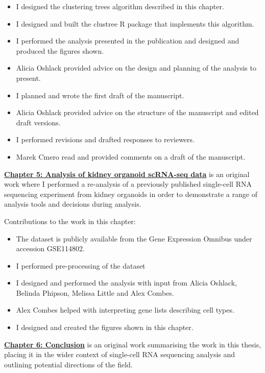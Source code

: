 \documentclass[11pt,a4paper,titlepage,twoside,openright]{style/unimelbthesis}
\theoremstyle{definition}
\theoremstyle{definition}
\theoremstyle{definition}
\theoremstyle{remark}
\begin{document}
\begin{frontmatter}
\begin{preface}
    \begin{itemize}
    \item
      I designed the clustering trees algorithm described in this chapter.
    \item
      I designed and built the clustree R package that implements this algorithm.
    \item
      I performed the analysis presented in the publication and designed and produced the figures shown.
    \item
      Alicia Oshlack provided advice on the design and planning of the analysis to present.
    \item
      I planned and wrote the first draft of the manuscript.
    \item
      Alicia Oshlack provided advice on the structure of the manuscript and edited draft versions.
    \item
      I performed revisions and drafted responses to reviewers.
    \item
      Marek Cmero read and provided comments on a draft of the manuscript.
    \end{itemize}
    
    \textbf{\protect\hyperlink{analysis}{Chapter 5: Analysis of kidney organoid scRNA-seq data}} is an original work where I performed a re-analysis of a previously published single-cell RNA sequencing experiment from kidney organoids in order to demonstrate a range of analysis tools and decisions during analysis.
    
    Contributions to the work in this chapter:
    
    \begin{itemize}
    \item
      The dataset is publicly available from the Gene Expression Omnibus under accession GSE114802.
    \item
      I performed pre-processing of the dataset
    \item
      I designed and performed the analysis with input from Alicia Oshlack, Belinda Phipson, Melissa Little and Alex Combes.
    \item
      Alex Combes helped with interpreting gene lists describing cell types.
    \item
      I designed and created the figures shown in this chapter.
    \end{itemize}
    
    \textbf{\protect\hyperlink{conclusion}{Chapter 6: Conclusion}} is an original work summarising the work in this thesis, placing it in the wider context of single-cell RNA sequencing analysis and outlining potential directions of the field.
    

\end{preface}
\end{frontmatter}
\end{document}
